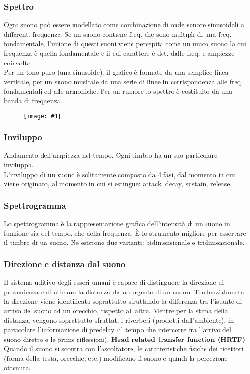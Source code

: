 \documentclass[8pt,a4paper]{article}
\newcommand{\f}[1]{
      \begin{figure}[H]
        \center
      \texttt{[image: \#1]}
      \end{figure}
}
\begin{document}
\begin{multicols}{5}
    \subsubsection{Spettro}
    Ogni suono può essere modellato come combinazione di onde sonore sinusoidali a
    differenti frequenze. Se un suono contiene freq. che sono multipli di una freq.
    fondamentale, l'unione di questi suoni viene percepita come un unico suono
    la cui frequenza è quella fondamentale e il cui carattere è det. dalle freq.
    e ampiezze coinvolte. \\
    Per un tono puro (una sinusoide), il grafico è formato da una semplice linea 
    verticale, per un suono musicale da una serie di linee in corrispondenza alle 
    freq. fondamentali ed alle armoniche. Per un rumore lo spettro è costituito da una
    banda di frequenza.
    
    \f{noise-types}

    \subsubsection{Inviluppo}
    Andamento dell'ampiezza nel tempo. Ogni timbro ha un suo particolare inviluppo. \\
    L’inviluppo di un suono è solitamente composto da 4 fasi, dal momento in cui viene 
    originato, al momento in cui si estingue: attack, decay, sustain, release.

    \subsubsection{Spettrogramma}
    Lo spettrogramma è la rappresentazione grafica dell'intensità di un suono in funzione
    sia del tempo, che della frequenza. È lo strumento migliore per osservare il timbro
    di un suono. Ne esistono due varianti: bidimensionale e tridimensionale.
 
    \subsubsection{Direzione e distanza dal suono}
    Il sistema uditivo degli esseri umani è capace di distinguere la direzione di 
    provenienza e di stimare la distanza della sorgente di un suono. Tendenzialmente 
    la direzione viene identificata soprattutto sfruttando la differenza tra l’istante 
    di arrivo del suono ad un orecchio, rispetto all’altro. Mentre per la stima della 
    distanza, vengono soprattutto sfruttati i riverberi (prodotti dall’ambiente), in
    particolare l’informazione di predelay (il tempo che intercorre fra l’arrivo del
    suono diretto e le prime riflessioni).
    \textbf{Head related transfer function (HRTF)}
    Quando il suono si scontra con l’ascoltatore, le caratteristiche fisiche dei 
    ricettori (forma della testa, orecchie, etc.) modificano il suono e quindi la 
    percezione ottenuta.
 

\end{multicols}
\end{document}
